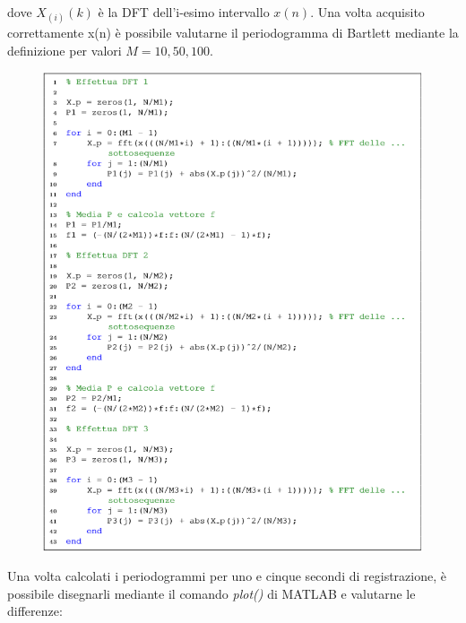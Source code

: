 \bigskip

dove $X_{(i)}(k)$ è la DFT dell'i-esimo intervallo $x(n)$. Una volta 
acquisito correttamente x(n) è possibile valutarne il periodogramma di 
Bartlett mediante la deﬁnizione per valori $M = 10, 50, 100$.

\begin{figure}[H]
	\centering
	\includegraphics[width=.8\textwidth]{./images/cap4/mat_barlett.png}
\end{figure}

Una volta calcolati i periodogrammi per uno e cinque secondi di registrazione, 
è possibile disegnarli mediante il comando \textit{plot()} di MATLAB e 
valutarne le diﬀerenze:

